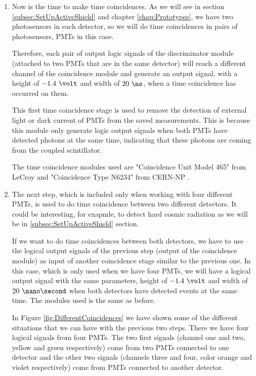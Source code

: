 \begin{itemize}
\begin{enumerate}
\item{} Now is the time to make time coincidences. As we will see in section \ref{subsec:SetUpActiveShield} and chapter \ref{chap:Prototypes}, we have two photosensors in each detector, so we will do time coincidences in pairs of photosensors, PMTs in this case.

Therefore, each pair of output logic signals of the discriminator module (attached to two PMTs that are in the same detector) will reach a different channel of the coincidence module and generate an output signal, with a height of $-1.4~\volt$ and width of $20~\ns$, when a time coincidence has occurred on them.

This first time coincidence stage is used to remove the detection of  external light or dark current of PMTs from the saved measurements. This is because this module only generate logic output signals when both PMTs have detected photons at the same time, indicating that these photons are coming from the coupled scintillator.

The time coincidence modules used are "Coincidence Unit Model 465" from LeCroy \cite{DataSheetCoincidenceLeCroy} and "Coincidence Type N6234" from CERN-NP \cite{DataSheetCoincidenceCERN}.

\item{} The next step, which is included only when working with four different PMTs, is used to do time coincidence between two different detectors. It could be interesting, for exapmle, to detect hard cosmic radiation as we will be in \ref{subsec:SetUpActiveShield} section.

If we want to do time coincidences between both detectors, we have to use the logical output signals of the previous step (output of the coincidence module) as input of another coincidence stage similar to the previous one. In this case, which is only used when we have four PMTs, we will have a logical output signal with the same parameters, height of $-1.4~\volt$ and width of $20~\nano\second$ when both detectors have detected events at the same time. The modules used is the same as before.

In Figure \ref{fig:DifferentCoincidences} we have shown some of the different situations that we can have with the previous two steps. There we have four logical signals from four PMTs. The two first signals (channel one and two, yellow and green respectively) come from two PMTs connected to one detector and the other two signals (channels three and four, color orange and violet respectively) come from PMTs connected to another detector.


\end{enumerate}
\end{itemize}
